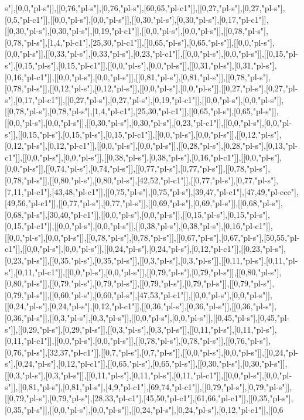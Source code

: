 s"],[0,0,"pl-s"]],[[0,76,"pl-s"],[0,76,"pl-s"],[60,65,"pl-c1"]],[[0,27,"pl-s"],[0,27,"pl-s"],[0,5,"pl-c1"]],[[0,0,"pl-s"],[0,0,"pl-s"]],[[0,30,"pl-s"],[0,30,"pl-s"],[0,17,"pl-c1"]],[[0,30,"pl-s"],[0,30,"pl-s"],[0,19,"pl-c1"]],[[0,0,"pl-s"],[0,0,"pl-s"]],[[0,78,"pl-s"],[0,78,"pl-s"],[1,4,"pl-c1"],[25,30,"pl-c1"]],[[0,65,"pl-s"],[0,65,"pl-s"]],[[0,0,"pl-s"],[0,0,"pl-s"]],[[0,33,"pl-s"],[0,33,"pl-s"],[0,23,"pl-c1"]],[[0,0,"pl-s"],[0,0,"pl-s"]],[[0,15,"pl-s"],[0,15,"pl-s"],[0,15,"pl-c1"]],[[0,0,"pl-s"],[0,0,"pl-s"]],[[0,31,"pl-s"],[0,31,"pl-s"],[0,16,"pl-c1"]],[[0,0,"pl-s"],[0,0,"pl-s"]],[[0,81,"pl-s"],[0,81,"pl-s"]],[[0,78,"pl-s"],[0,78,"pl-s"]],[[0,12,"pl-s"],[0,12,"pl-s"]],[[0,0,"pl-s"],[0,0,"pl-s"]],[[0,27,"pl-s"],[0,27,"pl-s"],[0,17,"pl-c1"]],[[0,27,"pl-s"],[0,27,"pl-s"],[0,19,"pl-c1"]],[[0,0,"pl-s"],[0,0,"pl-s"]],[[0,78,"pl-s"],[0,78,"pl-s"],[1,4,"pl-c1"],[25,30,"pl-c1"]],[[0,65,"pl-s"],[0,65,"pl-s"]],[[0,0,"pl-s"],[0,0,"pl-s"]],[[0,30,"pl-s"],[0,30,"pl-s"],[0,23,"pl-c1"]],[[0,0,"pl-s"],[0,0,"pl-s"]],[[0,15,"pl-s"],[0,15,"pl-s"],[0,15,"pl-c1"]],[[0,0,"pl-s"],[0,0,"pl-s"]],[[0,12,"pl-s"],[0,12,"pl-s"],[0,12,"pl-c1"]],[[0,0,"pl-s"],[0,0,"pl-s"]],[[0,28,"pl-s"],[0,28,"pl-s"],[0,13,"pl-c1"]],[[0,0,"pl-s"],[0,0,"pl-s"]],[[0,38,"pl-s"],[0,38,"pl-s"],[0,16,"pl-c1"]],[[0,0,"pl-s"],[0,0,"pl-s"]],[[0,74,"pl-s"],[0,74,"pl-s"]],[[0,77,"pl-s"],[0,77,"pl-s"]],[[0,78,"pl-s"],[0,78,"pl-s"]],[[0,80,"pl-s"],[0,80,"pl-s"],[42,52,"pl-c1"]],[[0,77,"pl-s"],[0,77,"pl-s"],[7,11,"pl-c1"],[43,48,"pl-c1"]],[[0,75,"pl-s"],[0,75,"pl-s"],[39,47,"pl-c1"],[47,49,"pl-cce"],[49,56,"pl-c1"]],[[0,77,"pl-s"],[0,77,"pl-s"]],[[0,69,"pl-s"],[0,69,"pl-s"]],[[0,68,"pl-s"],[0,68,"pl-s"],[30,40,"pl-c1"]],[[0,0,"pl-s"],[0,0,"pl-s"]],[[0,15,"pl-s"],[0,15,"pl-s"],[0,15,"pl-c1"]],[[0,0,"pl-s"],[0,0,"pl-s"]],[[0,38,"pl-s"],[0,38,"pl-s"],[0,16,"pl-c1"]],[[0,0,"pl-s"],[0,0,"pl-s"]],[[0,78,"pl-s"],[0,78,"pl-s"]],[[0,67,"pl-s"],[0,67,"pl-s"],[50,55,"pl-c1"]],[[0,0,"pl-s"],[0,0,"pl-s"]],[[0,24,"pl-s"],[0,24,"pl-s"],[0,12,"pl-c1"]],[[0,23,"pl-s"],[0,23,"pl-s"]],[[0,35,"pl-s"],[0,35,"pl-s"]],[[0,3,"pl-s"],[0,3,"pl-s"]],[[0,11,"pl-s"],[0,11,"pl-s"],[0,11,"pl-c1"]],[[0,0,"pl-s"],[0,0,"pl-s"]],[[0,79,"pl-s"],[0,79,"pl-s"]],[[0,80,"pl-s"],[0,80,"pl-s"]],[[0,79,"pl-s"],[0,79,"pl-s"]],[[0,79,"pl-s"],[0,79,"pl-s"]],[[0,79,"pl-s"],[0,79,"pl-s"]],[[0,60,"pl-s"],[0,60,"pl-s"],[47,53,"pl-c1"]],[[0,0,"pl-s"],[0,0,"pl-s"]],[[0,24,"pl-s"],[0,24,"pl-s"],[0,12,"pl-c1"]],[[0,36,"pl-s"],[0,36,"pl-s"]],[[0,36,"pl-s"],[0,36,"pl-s"]],[[0,3,"pl-s"],[0,3,"pl-s"]],[[0,0,"pl-s"],[0,0,"pl-s"]],[[0,45,"pl-s"],[0,45,"pl-s"]],[[0,29,"pl-s"],[0,29,"pl-s"]],[[0,3,"pl-s"],[0,3,"pl-s"]],[[0,11,"pl-s"],[0,11,"pl-s"],[0,11,"pl-c1"]],[[0,0,"pl-s"],[0,0,"pl-s"]],[[0,78,"pl-s"],[0,78,"pl-s"]],[[0,76,"pl-s"],[0,76,"pl-s"],[32,37,"pl-c1"]],[[0,7,"pl-s"],[0,7,"pl-s"]],[[0,0,"pl-s"],[0,0,"pl-s"]],[[0,24,"pl-s"],[0,24,"pl-s"],[0,12,"pl-c1"]],[[0,65,"pl-s"],[0,65,"pl-s"]],[[0,30,"pl-s"],[0,30,"pl-s"]],[[0,3,"pl-s"],[0,3,"pl-s"]],[[0,11,"pl-s"],[0,11,"pl-s"],[0,11,"pl-c1"]],[[0,0,"pl-s"],[0,0,"pl-s"]],[[0,81,"pl-s"],[0,81,"pl-s"],[4,9,"pl-c1"],[69,74,"pl-c1"]],[[0,79,"pl-s"],[0,79,"pl-s"]],[[0,79,"pl-s"],[0,79,"pl-s"],[28,33,"pl-c1"],[45,50,"pl-c1"],[61,66,"pl-c1"]],[[0,35,"pl-s"],[0,35,"pl-s"]],[[0,0,"pl-s"],[0,0,"pl-s"]],[[0,24,"pl-s"],[0,24,"pl-s"],[0,12,"pl-c1"]],[[0,6